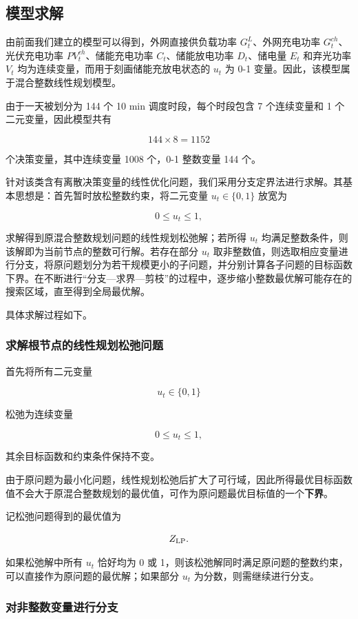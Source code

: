 \subsection{模型求解}

由前面我们建立的模型可以得到，外网直接供负载功率 \(G_t^L\)、外网充电功率 \(G_t^{ch}\)、光伏充电功率 \(PV_t^{ch}\)、储能充电功率 \(C_t\)、储能放电功率 \(D_t\)、储电量 \(E_t\) 和弃光功率 \(V_t\) 均为连续变量，而用于刻画储能充放电状态的 \(u_t\) 为 0-1 变量。因此，该模型属于混合整数线性规划模型。

由于一天被划分为 144 个 10 min 调度时段，每个时段包含 7 个连续变量和 1 个二元变量，因此模型共有

\[
144\times 8=1152
\]

个决策变量，其中连续变量 1008 个，0-1 整数变量 144 个。

针对该类含有离散决策变量的线性优化问题，我们采用分支定界法进行求解。其基本思想是：首先暂时放松整数约束，将二元变量 \(u_t\in\{0,1\}\) 放宽为

\[
0\leq u_t\leq1,
\]

求解得到原混合整数规划问题的线性规划松弛解；若所得 \(u_t\) 均满足整数条件，则该解即为当前节点的整数可行解。若存在部分 \(u_t\) 取非整数值，则选取相应变量进行分支，将原问题划分为若干规模更小的子问题，并分别计算各子问题的目标函数下界。在不断进行“分支—求界—剪枝”的过程中，逐步缩小整数最优解可能存在的搜索区域，直至得到全局最优解。

具体求解过程如下。

\subsubsection{求解根节点的线性规划松弛问题}

首先将所有二元变量

\[
u_t\in\{0,1\}
\]

松弛为连续变量

\[
0\leq u_t\leq1,
\]

其余目标函数和约束条件保持不变。

由于原问题为最小化问题，线性规划松弛后扩大了可行域，因此所得最优目标函数值不会大于原混合整数规划的最优值，可作为原问题最优目标值的一个\textbf{下界}。

记松弛问题得到的最优值为

\[
Z_{\rm LP}.
\]

如果松弛解中所有 \(u_t\) 恰好均为 0 或 1，则该松弛解同时满足原问题的整数约束，可以直接作为原问题的最优解；如果部分 \(u_t\) 为分数，则需继续进行分支。

\subsubsection{对非整数变量进行分支}

